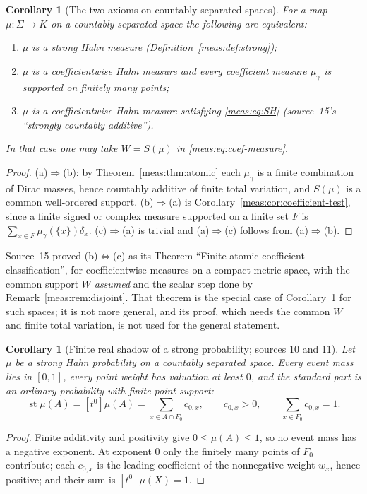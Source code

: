 \documentclass[11pt]{article}
\numberwithin{equation}{section}
\newtheorem{corollary}[theorem]{Corollary}
\theoremstyle{definition}
\theoremstyle{remark}
\newcommand{\st}{\operatorname{st}}
\newcommand{\coef}[2]{[t^{#1}]#2}
\begin{document}
\begin{corollary}[The two axioms on countably separated spaces]
\label{meas:cor:two-axioms}
For a map $\mu:\Sigma\to K$ on a countably separated space the following are
equivalent:
\begin{enumerate}[label=(\alph*)]
\item $\mu$ is a strong Hahn measure (Definition~\ref{meas:def:strong});
\item $\mu$ is a coefficientwise Hahn measure and every coefficient measure
$\mu_\gamma$ is supported on finitely many points;
\item $\mu$ is a coefficientwise Hahn measure satisfying \eqref{meas:eq:SH}
(source~15's ``strongly countably additive'').
\end{enumerate}
In that case one may take $W=S(\mu)$ in \eqref{meas:eq:coef-measure}.
\end{corollary}
\begin{proof}
(a)$\Rightarrow$(b): by Theorem~\ref{meas:thm:atomic} each $\mu_\gamma$ is a
finite combination of Dirac masses, hence countably additive of finite total
variation, and $S(\mu)$ is a common well-ordered support.
(b)$\Rightarrow$(a) is Corollary~\ref{meas:cor:coefficient-test}, since a finite
signed or complex measure supported on a finite set $F$ is
$\sum_{x\in F}\mu_\gamma(\{x\})\delta_x$. (c)$\Rightarrow$(a) is trivial and
(a)$\Rightarrow$(c) follows from (a)$\Rightarrow$(b).
\end{proof}

Source~15 proved (b)$\Leftrightarrow$(c) as its Theorem ``Finite-atomic
coefficient classification'', for coefficientwise measures on a compact metric
space, with the common support $W$ \emph{assumed} and the scalar step done by
Remark~\ref{meas:rem:disjoint}. That theorem is the special case of
Corollary~\ref{meas:cor:two-axioms} for such spaces; it is not more general,
and its proof, which needs the common $W$ and finite total variation, is not
used for the general statement.

\begin{corollary}[Finite real shadow of a strong probability; sources 10
and 11]\label{meas:cor:shadow}
Let $\mu$ be a strong Hahn probability on a countably separated space. Every
event mass lies in $[0,1]$, every point weight has valuation at least $0$, and
the standard part is an ordinary probability with finite point support:
\[
 \st\mu(A)=\coef{0}{\mu(A)}=\sum_{x\in A\cap F_0}c_{0,x},\qquad
 c_{0,x}>0,\qquad \sum_{x\in F_0}c_{0,x}=1.
\]
\end{corollary}
\begin{proof}
Finite additivity and positivity give $0\le\mu(A)\le1$, so no event mass has a
negative exponent. At exponent $0$ only the finitely many points of $F_0$
contribute; each $c_{0,x}$ is the leading coefficient of the nonnegative weight
$w_x$, hence positive; and their sum is $\coef{0}{\mu(X)}=1$.
\end{proof}
\end{document}
